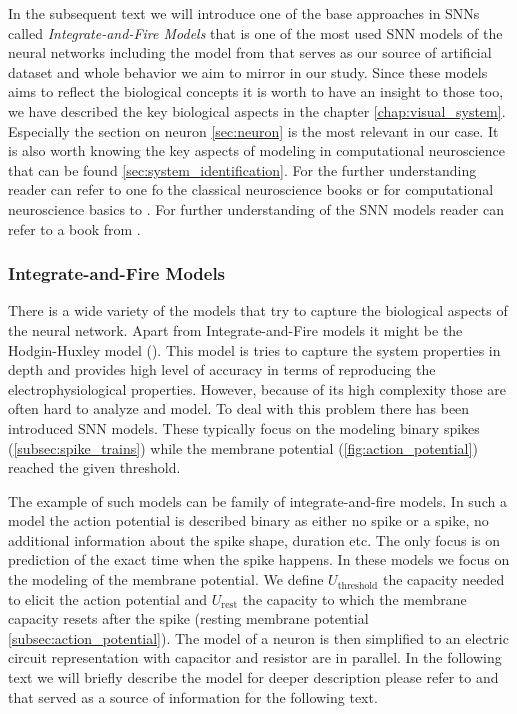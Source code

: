 In the subsequent text we will introduce one of the base approaches in SNNs called \emph{Integrate-and-Fire Models} that is one of the most used SNN models of the neural networks including the model from \citet{antolik2024comprehensive} that serves as our source of artificial dataset and whole behavior we aim to mirror in our study. Since these models aims to reflect the biological concepts it is worth to have an insight to those too, we have described the key biological aspects in the chapter \ref{chap:visual_system}. Especially the section on neuron \ref{sec:neuron} is the most relevant in our case. It is also worth knowing the key aspects of modeling in computational neuroscience that can be found \ref{sec:system_identification}. For the further understanding reader can refer to one fo the classical neuroscience books \citet{bear2020neuroscience} or for computational neuroscience basics to \citet{dayan2005theoretical}. For further understanding of the SNN models reader can refer to a book from \citet{gerstner2002spiking}.

\subsubsection{Integrate-and-Fire Models}
\label{subsubsec:integrate_and_fire}
There is a wide variety of the models that try to capture the biological aspects of the neural network. Apart from Integrate-and-Fire models it might be the Hodgin-Huxley model (\citet{hodgkin1952quantitative}). This model is tries to capture the system properties in depth and provides high level of accuracy in terms of reproducing the electrophysiological properties. However, because of its high complexity those are often hard to analyze and model. To deal with this problem there has been introduced SNN models. These typically focus on the modeling binary spikes (\ref{subsec:spike_trains}) while the membrane potential (\ref{fig:action_potential}) reached the given threshold.

The example of such models can be family of integrate-and-fire models. In such a model the action potential is described binary as either no spike or a spike, no additional information about the spike shape, duration etc. The only focus is on prediction of the exact time when the spike happens. In these models we focus on the modeling of the membrane potential. We define $U_{\text{threshold}}$ the capacity needed to elicit the action potential and $U_{\text{rest}}$ the capacity to which the membrane capacity resets after the spike (resting membrane potential \ref{subsec:action_potential}). The model of a neuron is then simplified to an electric circuit representation with capacitor and resistor are in parallel. In the following text we will briefly describe the model for deeper description please refer to \citet{dayan2005theoretical} and \citet{gerstner2002spiking} that served as a source of information for the following text.

